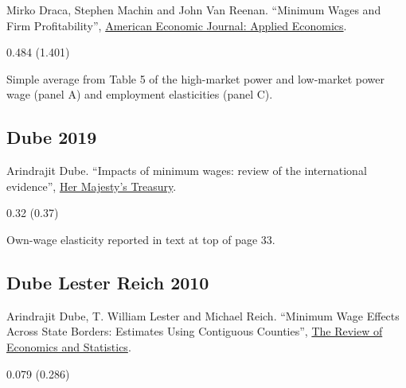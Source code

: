 \noindent Mirko Draca, Stephen Machin and John Van Reenan. ``Minimum Wages and Firm Profitability'', \href{https://doi.org/10.1257/app.3.1.129}{American Economic Journal: Applied Economics}.

\vspace{0.7em}

 0.484 (1.401)

\vspace{0.7em}

 Simple average from Table 5 of the high-market power and low-market power wage (panel A) and employment elasticities (panel C).

\subsection*{Dube 2019}
\vspace{-0.7em}

\noindent Arindrajit Dube. ``Impacts of minimum wages: review of the international evidence'', \href{https://assets.publishing.service.gov.uk/government/uploads/system/uploads/attachment_data/file/844350/impacts_of_minimum_wages_review_of_the_international_evidence_Arindrajit_Dube_web.pdf}{Her Majesty's Treasury}.

\vspace{0.7em}

 0.32 (0.37)

\vspace{0.7em}

 Own-wage elasticity reported in text at top of page 33.

\subsection*{Dube Lester Reich 2010}
\vspace{-0.7em}

\noindent Arindrajit Dube, T. William Lester and Michael Reich. ``Minimum Wage Effects Across State Borders: Estimates Using Contiguous Counties'', \href{https://doi.org/10.1162/REST_a_00039}{The Review of Economics and Statistics}.

\vspace{0.7em}

 0.079 (0.286)

\vspace{0.7em}

